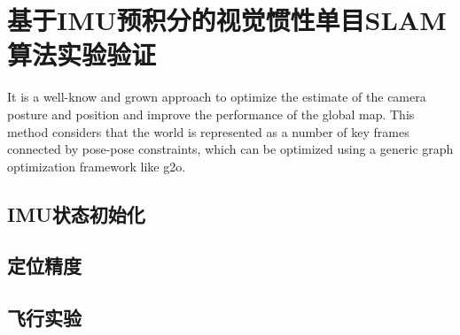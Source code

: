 \section{基于IMU预积分的视觉惯性单目SLAM算法实验验证}

It is a well-know and grown approach to optimize the estimate of the camera posture and position and improve the performance of the global map. This method considers that the world is represented as a number of key frames connected by pose-pose constraints, which can be optimized using a generic graph optimization framework like g2o.

\subsection{IMU状态初始化}

\subsection{定位精度}

\subsection{飞行实验}









